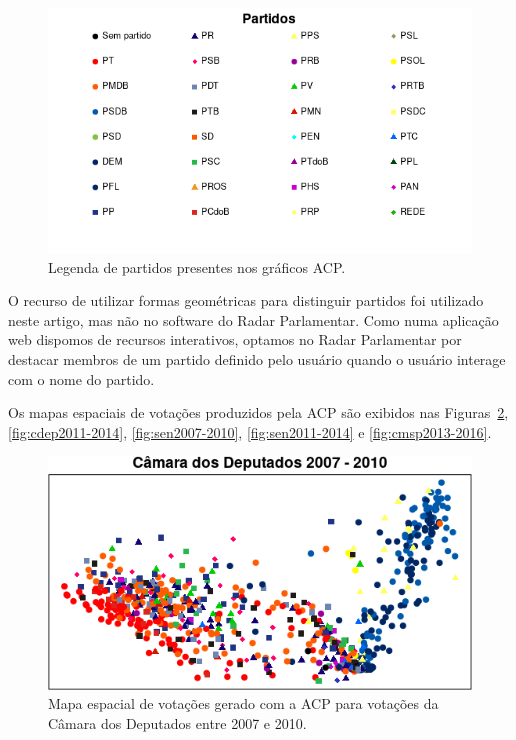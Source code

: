 \documentclass[a4paper, 12pt]{article}
\begin{document}
\begin{figure}[h!]
  \centering
  \includegraphics[scale=0.8]{figs/partidos.png}
  \caption{Legenda de partidos presentes nos gráficos ACP.}
  \label{fig:partidos}
\end{figure}

O recurso de utilizar formas geométricas para distinguir partidos foi utilizado neste artigo, mas não no software do Radar Parlamentar. Como numa aplicação web dispomos de recursos interativos, optamos no Radar Parlamentar por destacar membros de um partido definido pelo usuário quando o usuário interage com o nome do partido.

Os mapas espaciais de votações produzidos pela ACP são exibidos nas Figuras~\ref{fig:cdep2007-2010}, \ref{fig:cdep2011-2014}, \ref{fig:sen2007-2010}, \ref{fig:sen2011-2014} e \ref{fig:cmsp2013-2016}.

\begin{figure}[h!]
  \centering
  \includegraphics[scale=0.9]{figs/cdep2007-2010.png}
  \caption{Mapa espacial de votações gerado com a ACP para votações da Câmara dos Deputados entre 2007 e 2010.}
  \label{fig:cdep2007-2010}
\end{figure}
\end{document}

